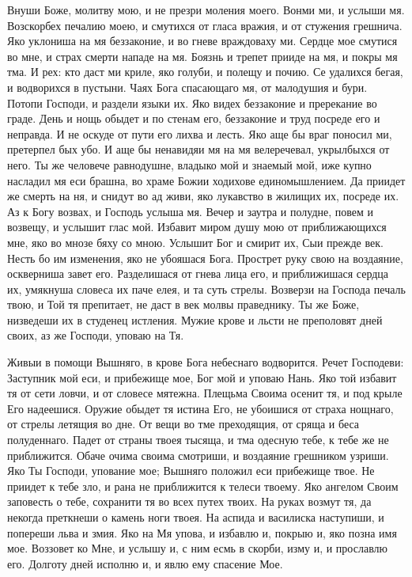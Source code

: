 

Внуши Боже, молитву мою, и не презри моления моего. Вонми ми, и услыши мя. Возскорбех печалию моею, и смутихся от гласа вражия, и от стужения грешнича. Яко уклониша на мя беззаконие, и во гневе враждоваху ми. Сердце мое смутися во мне, и страх смерти нападе на мя. Боязнь и трепет прииде на мя, и покры мя тма. И рех: кто даст ми криле, яко голуби, и полещу и почию. Се удалихся бегая, и водворихся в пустыни. Чаях Бога спасающаго мя, от малодушия и бури. Потопи Господи, и раздели языки их. Яко видех беззаконие и пререкание во граде. День и нощь обыдет и по стенам его, беззаконие и труд посреде его и неправда. И не оскуде от пути его лихва и лесть. Яко аще бы враг поносил ми, претерпел бых убо. И аще бы ненавидяи мя на мя велеречевал, укрылбыхся от него. Ты же человече равнодушне, владыко мой и знаемый мой, иже купно насладил мя еси брашна, во храме Божии ходихове единомышлением. Да приидет же смерть на ня, и снидут во ад живи, яко лукавство в жилищих их, посреде их. Аз к Богу возвах, и Господь услыша мя. Вечер и заутра и полудне, повем и возвещу, и услышит глас мой. Избавит миром душу мою от приближающихся мне, яко во мнозе бяху со мною. Услышит Бог и смирит их, Сыи прежде век. Несть бо им изменения, яко не убояшася Бога. Прострет руку свою на воздаяние, оскверниша завет его. Разделишася от гнева лица его, и приближишася сердца их, умякнуша словеса их паче елея, и та суть стрелы. Возверзи на Господа печаль твою, и Той тя препитает, не даст в век молвы праведнику. Ты же Боже, низведеши их в студенец истления. Мужие крове и льсти не преполовят дней своих, аз же Господи, уповаю на Тя.




Живыи в помощи Вышняго, в крове Бога небеснаго водворится. Речет Господеви: Заступник мой еси, и прибежище мое, Бог мой и уповаю Нань. Яко той избавит тя от сети ловчи, и от словесе мятежна. Плещьма Своима осенит тя, и под крыле Его надеешися. Оружие обыдет тя истина Его, не убоишися от страха нощнаго, от стрелы летящия во дне. От вещи во тме преходящия, от сряща и беса полуденнаго. Падет от страны твоея тысяща, и тма одесную тебе, к тебе же не приближится. Обаче очима своима смотриши, и воздаяние грешником узриши. Яко Ты Господи, упование мое; Вышняго положил еси прибежище твое. Не приидет к тебе зло, и рана не приближится к телеси твоему. Яко ангелом Своим заповесть о тебе, сохранити тя во всех путех твоих. На руках возмут тя, да некогда преткнеши о камень ноги твоея. На аспида и василиска наступиши, и попереши льва и змия. Яко на Мя упова, и избавлю и, покрыю и, яко позна имя мое. Воззовет ко Мне, и услышу и, с ним есмь в скорби, изму и, и прославлю его. Долготу дней исполню и, и явлю ему спасение Мое. 


